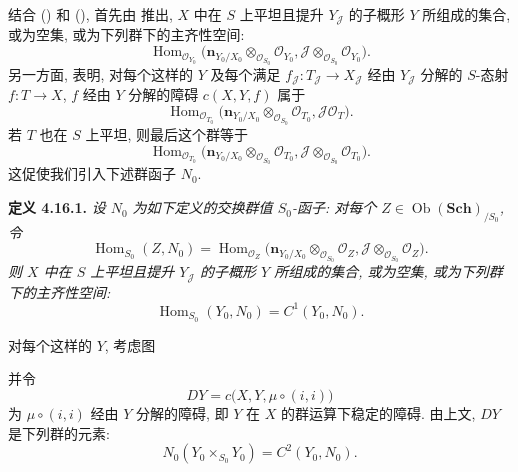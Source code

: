 结合 ()
和 (),
首先由 推出,
\(X\) 中在 \(S\) 上平坦且提升 \(Y_{\mathscr J}\) 的子概形 \(Y\) 所组成的集合,
或为空集, 或为下列群下的主齐性空间:
\begin{equation*}
 \tag{4.16.3}\label{sga3:iii:paragraph:4-16:equation:4-16-3}
 \operatorname{Hom}_{\mathscr O_{Y_0}}
\bigl(\mathbf n_{Y_0/X_0}\otimes_{\mathscr O_{S_0}}\mathscr O_{Y_0},
       \mathscr J\otimes_{\mathscr O_{S_0}}\mathscr O_{Y_0}\bigr).
\end{equation*}
另一方面,  表明,
对每个这样的 \(Y\) 及每个满足
\(f_{\mathscr J}:T_{\mathscr J}\to X_{\mathscr J}\) 经由
\(Y_{\mathscr J}\) 分解的 \(S\)-态射 \(f:T\to X\),
\(f\) 经由 \(Y\) 分解的障碍 \(c(X,Y,f)\) 属于
\[
 \operatorname{Hom}_{\mathscr O_{T_0}}
\bigl(\mathbf n_{Y_0/X_0}\otimes_{\mathscr O_{S_0}}\mathscr O_{T_0},
       \mathscr J\mathscr O_T\bigr).
\]
若 \(T\) 也在 \(S\) 上平坦, 则最后这个群等于
\[
 \operatorname{Hom}_{\mathscr O_{T_0}}
\bigl(\mathbf n_{Y_0/X_0}\otimes_{\mathscr O_{S_0}}\mathscr O_{T_0},
       \mathscr J\otimes_{\mathscr O_{S_0}}\mathscr O_{T_0}\bigr).
\]
这促使我们引入下述群函子 \(N_0\).

\medskip
\noindent{}\textbf{定义 4.16.1.}
\textit{设 \(N_0\) 为如下定义的交换群值 \(S_0\)-函子:
对每个 \(Z\in\operatorname{Ob}(\mathbf{Sch})_{/S_0}\), 令}
\begin{equation*}
 \tag{*}\label{sga3:iii:definition:4-16-1:equation:star}
 \operatorname{Hom}_{S_0}(Z,N_0)
 =\operatorname{Hom}_{\mathscr O_Z}
\bigl(\mathbf n_{Y_0/X_0}\otimes_{\mathscr O_{S_0}}\mathscr O_Z,
       \mathscr J\otimes_{\mathscr O_{S_0}}\mathscr O_Z\bigr).
\end{equation*}
\textit{则 \(X\) 中在 \(S\) 上平坦且提升 \(Y_{\mathscr J}\) 的子概形
\(Y\) 所组成的集合, 或为空集, 或为下列群下的主齐性空间:}
\[
 \operatorname{Hom}_{S_0}(Y_0,N_0)=C^1(Y_0,N_0).
\]

对每个这样的 \(Y\), 考虑图

\begin{center}
\end{center}

并令
\[
 DY=c\bigl(X,Y,\mu\circ(i,i)\bigr)
\]
为 \(\mu\circ(i,i)\) 经由 \(Y\) 分解的障碍,
即 \(Y\) 在 \(X\) 的群运算下稳定的障碍.
由上文, \(DY\) 是下列群的元素:
\[
 N_0(Y_0\times_{S_0}Y_0)=C^2(Y_0,N_0).
\]

